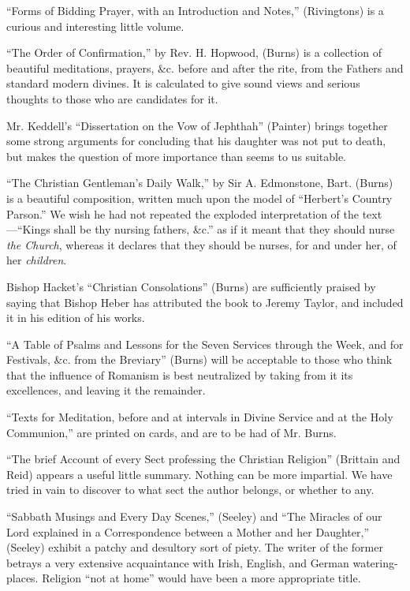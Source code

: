 ``Forms of Bidding Prayer, with an Introduction and
Notes,'' (Rivingtons) is a curious and interesting little volume.

``The Order of Confirmation,'' by Rev. H. Hopwood,
(Burns) is a collection of beautiful meditations, prayers, \&c.
before and after the rite, from the Fathers and standard modern divines.
It is calculated to give sound views and serious thoughts to those who
are candidates for it.

Mr. Keddell's ``Dissertation on the Vow of Jephthah''
(Painter) brings together some strong arguments for concluding that his
daughter was not put to death, but makes the question of more importance
than seems to us suitable.

``The Christian Gentleman's Daily Walk,'' by Sir A.
Edmonstone, Bart. (Burns) is a beautiful composition, written much upon
the model of ``Herbert's Country Parson.'' We wish he had not repeated the
exploded interpretation of the text—``Kings shall be thy nursing
fathers, \&c.'' as if it meant that they should nurse \emph{the Church},
whereas it declares that they should be nurses, for and under her, of
her \emph{children}.

Bishop Hacket's ``Christian Consolations'' (Burns)
are sufficiently praised by saying that Bishop Heber has attributed the
book to Jeremy Taylor, and included it in his edition of his works.

``A Table of Psalms and Lessons for the Seven
Services through the Week, and for Festivals, \&c. from the Breviary''
(Burns) will be acceptable to those who think that the influence of
Romanism is best neutralized by taking from it its excellences, and
leaving it the remainder.

``Texts for Meditation, before and at intervals in
Divine Service and at the Holy Communion,'' are printed on cards, and are
to be had of Mr. Burns.

``The brief Account of every Sect professing the
Christian Religion'' (Brittain and Reid) appears a useful little summary.
Nothing can be more impartial. We have tried in vain to discover to what
sect the author belongs, or whether to any.

``Sabbath Musings and Every Day Scenes,'' (Seeley)
and ``The Miracles of our Lord explained in a Correspondence between a
Mother and her Daughter,'' (Seeley) exhibit a patchy and desultory sort
of piety. The writer of the former betrays a very extensive
acquaintance with Irish, English, and German watering-places. Religion ``not
at home'' would have been a more appropriate title.

